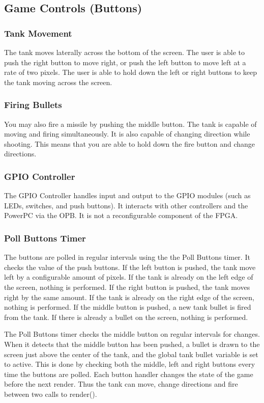 \documentclass[11pt,letter,oneside]{report}
\begin{document}
\subsection{Game Controls (Buttons)}
\subsubsection{Tank Movement}
The tank moves laterally across the bottom of the screen. The user is able to push the right button to move right, or push the left button to move left at a rate of two pixels. The user is able to hold down the left or right buttons to keep the tank moving across the screen.

\subsubsection{Firing Bullets}
You may also fire a missile by pushing the middle button. The tank is capable of moving and firing simultaneously. It is also capable of changing direction while shooting. This means that you are able to hold down the fire button and change directions.

\subsubsection{GPIO Controller}
The GPIO Controller handles input and output to the GPIO modules (such as LEDs, switches, and push buttons).  It interacts with other controllers and the PowerPC via the OPB.  It is not a reconfigurable component of the FPGA.

\subsubsection{Poll Buttons Timer}  The buttons are polled in regular intervals using the the Poll Buttons timer. It checks the value of the push buttons.  If the left button is pushed, the tank move  left by a configurable amount of pixels.  If the tank is already on the left edge of the screen, nothing is performed.  If the right button is pushed, the tank moves right by the same amount.  If the tank is already on the right edge of the screen, nothing is performed.  If the middle button is pushed, a new tank bullet is fired from the tank.  If there is already a bullet on the screen, nothing is performed.

The Poll Buttons timer checks the middle button on regular intervals for changes. When it detects that the middle button has been pushed, a bullet is drawn to the screen just above the center of the tank, and the global tank bullet variable is set to active. This is done by checking both the middle, left and right buttons every time the buttons are polled. Each button handler changes the state of the game before the next render. Thus the tank can move, change directions and fire between two calls to render().
\end{document}
